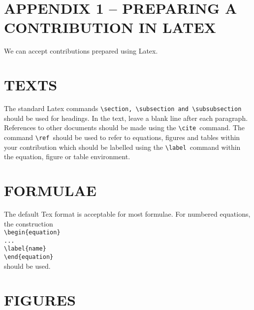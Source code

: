 \documentclass[dvips]{article}
\begin{document}

\section*{APPENDIX 1 -- PREPARING A CONTRIBUTION IN LATEX}

We can accept contributions prepared using Latex.

\section*{TEXTS}

The standard Latex commands \verb|\section, \subsection and \subsubsection|~
should be used for headings.
In the text, leave a blank line after each paragraph.
References to other documents should be
made using the \verb|\cite|~command.
The command \verb|\ref|~should be used to refer to 
equations, figures and tables within your contribution
which should be labelled using the \verb|\label|~command within the 
equation, figure or table environment.

\section*{FORMULAE}

The default Tex format is acceptable for most formulae.
For numbered equations, the construction \\
\verb|\begin{equation}|\\ 
\verb|...|\\
\verb|\label{name}|\\
\verb|\end{equation}|\\
should be used.

\section*{FIGURES}
\end{document}
